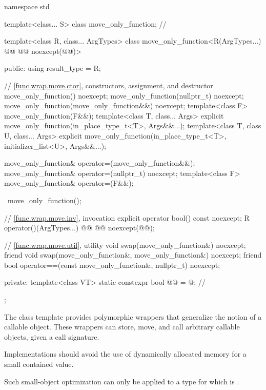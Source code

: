 %
\begin{codeblock}
namespace std {
  template<class... S> class move_only_function;                // \notdef

  template<class R, class... ArgTypes>
  class move_only_function<R(ArgTypes...) @\cv{}@ @@ noexcept(@@)> {
  public:
    using result_type = R;

    // \ref{func.wrap.move.ctor}, constructors, assignment, and destructor
    move_only_function() noexcept;
    move_only_function(nullptr_t) noexcept;
    move_only_function(move_only_function&&) noexcept;
    template<class F> move_only_function(F&&);
    template<class T, class... Args>
      explicit move_only_function(in_place_type_t<T>, Args&&...);
    template<class T, class U, class... Args>
      explicit move_only_function(in_place_type_t<T>, initializer_list<U>, Args&&...);

    move_only_function& operator=(move_only_function&&);
    move_only_function& operator=(nullptr_t) noexcept;
    template<class F> move_only_function& operator=(F&&);

    ~move_only_function();

    // \ref{func.wrap.move.inv}, invocation
    explicit operator bool() const noexcept;
    R operator()(ArgTypes...) @\cv{}@ @@ noexcept(@@);

    // \ref{func.wrap.move.util}, utility
    void swap(move_only_function&) noexcept;
    friend void swap(move_only_function&, move_only_function&) noexcept;
    friend bool operator==(const move_only_function&, nullptr_t) noexcept;

  private:
    template<class VT>
      static constexpr bool @@ = @\seebelow@;       // \expos
  };
}
\end{codeblock}

\pnum
The  class template provides polymorphic wrappers
that generalize the notion of a callable object.
These wrappers can store, move, and call arbitrary callable objects,
given a call signature.

\pnum
\recommended
Implementations should avoid the use of dynamically allocated memory
for a small contained value.
\begin{note}
Such small-object optimization can only be applied to a type 
for which  is .
\end{note}

